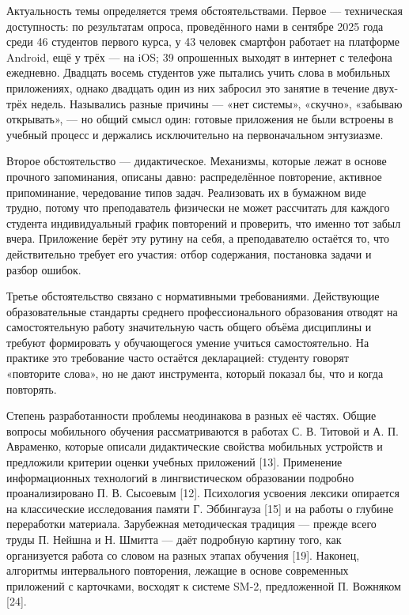 \documentclass[11pt,a4paper,openany]{report}
\begin{document}
Актуальность темы определяется тремя обстоятельствами. Первое — техническая доступность: по результатам опроса, проведённого нами в сентябре 2025 года среди 46 студентов первого курса, у 43 человек смартфон работает на платформе Android, ещё у трёх — на iOS; 39 опрошенных выходят в интернет с телефона ежедневно. Двадцать восемь студентов уже пытались учить слова в мобильных приложениях, однако двадцать один из них забросил это занятие в течение двух-трёх недель. Назывались разные причины — «нет системы», «скучно», «забываю открывать», — но общий смысл один: готовые приложения не были встроены в учебный процесс и держались исключительно на первоначальном энтузиазме.

Второе обстоятельство — дидактическое. Механизмы, которые лежат в основе прочного запоминания, описаны давно: распределённое повторение, активное припоминание, чередование типов задач. Реализовать их в бумажном виде трудно, потому что преподаватель физически не может рассчитать для каждого студента индивидуальный график повторений и проверить, что именно тот забыл вчера. Приложение берёт эту рутину на себя, а преподавателю остаётся то, что действительно требует его участия: отбор содержания, постановка задачи и разбор ошибок.

Третье обстоятельство связано с нормативными требованиями. Действующие образовательные стандарты среднего профессионального образования отводят на самостоятельную работу значительную часть общего объёма дисциплины и требуют формировать у обучающегося умение учиться самостоятельно. На практике это требование часто остаётся декларацией: студенту говорят «повторите слова», но не дают инструмента, который показал бы, что и когда повторять.

Степень разработанности проблемы неодинакова в разных её частях. Общие вопросы мобильного обучения рассматриваются в работах С. В. Титовой и А. П. Авраменко, которые описали дидактические свойства мобильных устройств и предложили критерии оценки учебных приложений [13]. Применение информационных технологий в лингвистическом образовании подробно проанализировано П. В. Сысоевым [12]. Психология усвоения лексики опирается на классические исследования памяти Г. Эббингауза [15] и на работы о глубине переработки материала. Зарубежная методическая традиция — прежде всего труды П. Нейшна и Н. Шмитта — даёт подробную картину того, как организуется работа со словом на разных этапах обучения [19]. Наконец, алгоритмы интервального повторения, лежащие в основе современных приложений с карточками, восходят к системе SM-2, предложенной П. Вожняком [24].
\end{document}
